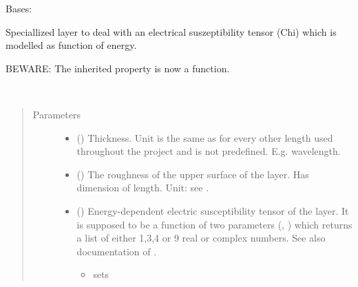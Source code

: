 \documentclass[letterpaper,10pt,english]{sphinxmanual}
\begin{document}
\begin{fulllineitems}
\label{\detokenize{modules-api/samplerepresentation:SampleRepresentation.ModelChiLayerObject}}
Bases: {\hyperref[\detokenize{modules-api/samplerepresentation:SampleRepresentation.LayerObject}]{}}

Speciallized layer to deal with an electrical suszeptibility tensor (Chi) which is modelled as function of energy.

BEWARE: The inherited property {\hyperref[\detokenize{modules-api/samplerepresentation:SampleRepresentation.LayerObject.chitensor}]{}} is now a function.

\begin{fulllineitems}
\label{\detokenize{modules-api/samplerepresentation:SampleRepresentation.ModelChiLayerObject.__init__}}~\begin{quote}\begin{description}
\item[{Parameters}] \leavevmode\begin{itemize}
\item {} 
 ({\hyperref[\detokenize{modules-api/parameters:Parameters.Parameter}]{}}) \textendash{} Thickness. Unit is the same as for every other length used throughout the project and is not predefined. E.g. wavelength.

\item {} 
 ({\hyperref[\detokenize{modules-api/parameters:Parameters.Parameter}]{}}) \textendash{} The roughness of the upper surface of the layer. Has dimension of length. Unit: see .

\item {} 
 () \textendash{} 
Energy-dependent electric susceptibility tensor of the layer.
It is supposed to be a function of two parameters (, ) which returns a list of either 1,3,4 or 9 real or complex numbers.
See also documentation of .
\begin{itemize}
\item {} 
\sphinxstyleemphasis{{[}chi{]}} sets 


\end{itemize}
\end{itemize}
\end{description}
\end{quote}
\end{fulllineitems}
\end{fulllineitems}
\end{document}
